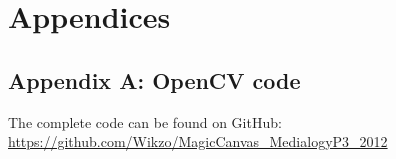 \chapter{Appendices}
\section{Appendix A: OpenCV code}
%

The complete code can be found on GitHub: \url{https://github.com/Wikzo/MagicCanvas_MedialogyP3_2012}